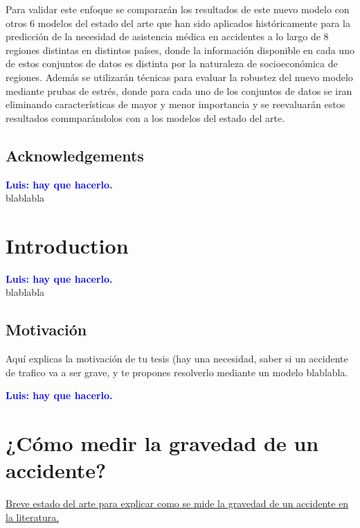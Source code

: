 \documentclass{uathesis-es}
\begin{document}
Para validar este enfoque se compararán los resultados de este nuevo modelo con otros 6 modelos del estado del arte que han sido aplicados históricamente para la predicción de la necesidad de asistencia médica en accidentes a lo largo de 8 regiones distintas en distintos países, donde la información disponible en cada uno de estos conjuntos de datos es distinta por la naturaleza de socioeconómica de regiones. Además se utilizarán técnicas para evaluar la robustez del nuevo modelo mediante prubas de estrés, donde para cada uno de los conjuntos de datos se iran eliminando características de mayor y menor importancia y se reevaluarán estos resultados commparándolos con a los modelos del estado del arte.

\section{Acknowledgements}

\textcolor{blue}{\textbf{Luis: hay que hacerlo.}}\\

blablabla

\chapter{Introduction}

\textcolor{blue}{\textbf{Luis: hay que hacerlo.}}\\


blablabla

\section{Motivación}
Aquí explicas la motivación de tu tesis (hay una necesidad, saber si un accidente de trafico va a ser grave, y te propones resolverlo mediante un modelo blablabla.

\textcolor{blue}{\textbf{Luis: hay que hacerlo.}}\\



\chapter{¿Cómo medir la gravedad de un accidente?}

\underline{Breve estado del arte para explicar como se mide la gravedad de un accidente en la literatura.}
\end{document}
